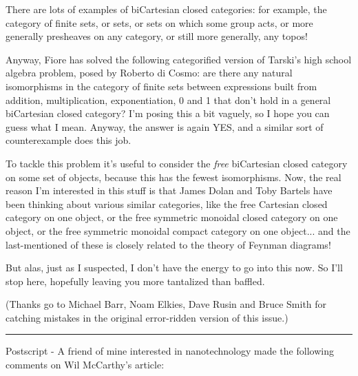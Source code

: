 There are lots of examples of biCartesian closed categories: for
example, the category of finite sets, or sets, or sets on which some
group acts, or more generally presheaves on any category, or still more
generally, any topos!  

Anyway, Fiore has solved the following categorified version of Tarski's
high school algebra problem, posed by Roberto di Cosmo: are there any
natural isomorphisms in the category of finite sets between expressions
built from addition, multiplication, exponentiation, 0 and 1 that don't
hold in a general biCartesian closed category?  I'm posing this a bit
vaguely, so I hope you can guess what I mean.  Anyway, the answer is
again YES, and a similar sort of counterexample does this job.

To tackle this problem it's useful to consider the \emph{free} biCartesian
closed category on some set of objects, because this has the fewest
isomorphisms.  Now, the real reason I'm interested in this stuff is that
James Dolan and Toby Bartels have been thinking about various similar
categories, like the free Cartesian closed category on one object, 
or the free symmetric monoidal closed category on one object, or the
free symmetric monoidal compact category on one object... and the
last-mentioned of these is closely related to the theory of Feynman 
diagrams!   

But alas, just as I suspected, I don't have the energy to go into this
now.  So I'll stop here, hopefully leaving you more tantalized than
baffled.

(Thanks go to Michael Barr, Noam Elkies, Dave Rusin and Bruce Smith for 
catching mistakes in the original error-ridden version of this issue.)

\par\noindent\rule{\textwidth}{0.4pt}

Postscript - A friend of mine interested in nanotechnology made the following
comments on Wil McCarthy's article:

